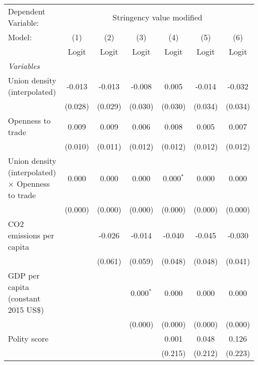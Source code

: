 
\begingroup
\centering
\begin{tabular}{lcccccc}
   \toprule
   Dependent Variable: & \multicolumn{6}{c}{Stringency value modified}\\
   Model:                                                   & (1)     & (2)     & (3)         & (4)         & (5)     & (6)\\  
                                                            &  Logit  & Logit   & Logit       & Logit       & Logit   & Logit\\  
   \midrule
   \emph{Variables}\\
   Union density (interpolated)                             & -0.013  & -0.013  & -0.008      & 0.005       & -0.014  & -0.032\\   
                                                            & (0.028) & (0.029) & (0.030)     & (0.030)     & (0.034) & (0.034)\\   
   Openness to trade                                        & 0.009   & 0.009   & 0.006       & 0.008       & 0.005   & 0.007\\   
                                                            & (0.010) & (0.011) & (0.012)     & (0.012)     & (0.012) & (0.012)\\   
   Union density (interpolated) $\times$ Openness to trade  & 0.000   & 0.000   & 0.000       & 0.000$^{*}$ & 0.000   & 0.000\\   
                                                            & (0.000) & (0.000) & (0.000)     & (0.000)     & (0.000) & (0.000)\\   
   CO2 emissions per capita                                 &         & -0.026  & -0.014      & -0.040      & -0.045  & -0.030\\   
                                                            &         & (0.061) & (0.059)     & (0.048)     & (0.048) & (0.041)\\   
   GDP per capita (constant 2015 US\$)                      &         &         & 0.000$^{*}$ & 0.000       & 0.000   & 0.000\\   
                                                            &         &         & (0.000)     & (0.000)     & (0.000) & (0.000)\\   
   Polity score                                             &         &         &             & 0.001       & 0.048   & 0.126\\   
                                                            &         &         &             & (0.215)     & (0.212) & (0.223)\\   

\end{tabular}

